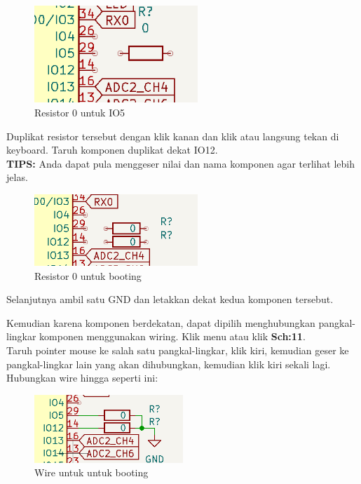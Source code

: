 \documentclass[12pt]{book}
\begin{document}
	\begin{figure}[!ht]
		\centering
		\includegraphics[width=0.55\textwidth]{images/sch/sch_12}
		\caption{Resistor 0 untuk IO5}
	\end{figure}

	Duplikat resistor tersebut dengan klik kanan dan klik 
	atau langsung tekan  di keyboard.
	Taruh komponen duplikat dekat IO12.\\

	\textbf{TIPS:} Anda dapat pula menggeser nilai dan nama komponen agar terlihat lebih jelas.

	\begin{figure}[!ht]
		\centering
		\includegraphics[width=0.55\textwidth]{images/sch/sch_13}
		\caption{Resistor 0 untuk booting}
	\end{figure}

	Selanjutnya ambil satu GND dan letakkan dekat kedua komponen tersebut.

	\newpage
	Kemudian karena komponen berdekatan, dapat dipilih menghubungkan pangkal-lingkar komponen
	menggunakan wiring.
	Klik menu  atau klik \textbf{Sch:11}.\\

	Taruh pointer mouse ke salah satu pangkal-lingkar, klik kiri,
	kemudian geser ke pangkal-lingkar lain yang akan dihubungkan, kemudian klik kiri sekali lagi.\\

	Hubungkan wire hingga seperti ini:

	\begin{figure}[!ht]
		\centering
		\includegraphics[width=0.5\textwidth]{images/sch/sch_14}
		\caption{Wire untuk untuk booting}
	\end{figure}
\end{document}
